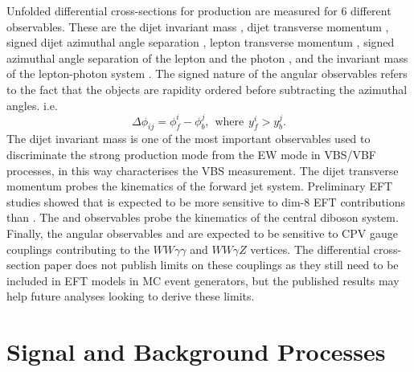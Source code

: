 Unfolded differential cross-sections for \ewwy production are measured for 6 different observables. These are the dijet invariant mass \mjj, dijet transverse momentum \jjpt, signed dijet azimuthal angle separation \jjdphi, lepton transverse momentum \leppt, signed azimuthal angle separation of the lepton and the photon \lepgamdphi, and the invariant mass of the lepton-photon system \lym. The signed nature of the angular observables refers to the fact that the objects are rapidity ordered before subtracting the azimuthal angles. i.e. 
\begin{equation}
  \Delta\phi_{ij}=\phi^i_f-\phi^j_b, \hspace{5pt}\text{where}\hspace{5pt} y^i_f>y^j_b.
\end{equation}
The dijet invariant mass is one of the most important observables used to discriminate the strong production mode from the EW mode in VBS/VBF processes, in this way \mjj characterises the VBS measurement. The dijet transverse momentum probes the kinematics of the forward jet system. Preliminary EFT studies showed that \ptjj is expected to be more sensitive to dim-8 EFT contributions than \mjj. The \leppt and \lym observables probe the kinematics of the central diboson system. %
Finally, the angular observables \jjdphi and \lepgamdphi are expected to be sensitive to CPV gauge couplings contributing to the $WW\gamma\gamma$ and $WW\gamma Z$ vertices. The \ewwy differential cross-section paper \cite{VBSWy:VBSWy} does not publish limits on these couplings as they still need to be included in EFT models in MC event generators, but the published results may help future analyses looking to derive these limits. 

\section{Signal and Background Processes}

